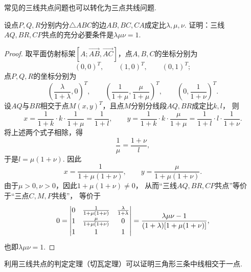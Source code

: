 常见的三线共点问题也可以转化为三点共线问题.

\begin{example}[切瓦定理]
设点\(P,Q,R\)分别内分\(\triangle ABC\)的边\(AB,BC,CA\)成定比\(\lambda,\mu,\nu\).
证明：三线\(AQ,BR,CP\)共点的充分必要条件是\(\lambda \mu \nu = 1\).
\begin{proof}
取平面仿射标架\([A;\vec{AB},\vec{AC}]\)，点\(A,B,C\)的坐标分别为\begin{equation*}
	(0,0)^T, \qquad
	(1,0)^T, \qquad
	(0,1)^T;
\end{equation*}
点\(P,Q,R\)的坐标分别为\begin{equation*}
	\left(\frac{\lambda}{1+\lambda},0\right)^T, \qquad
	\left(\frac{1}{1+\mu},\frac{\mu}{1+\mu}\right)^T, \qquad
	\left(0,\frac{1}{1+\nu}\right)^T.
\end{equation*}
设\(AQ\)与\(BR\)相交于点\(M(x,y)^T\)，且点\(M\)分别分线段\(AQ,BR\)成定比\(k,l\)，
则\begin{equation*}
x = \frac{1}{1+k} \cdot k \cdot \frac{1}{1+\mu}
= \frac{1}{1+l}, \qquad
y = \frac{1}{1+k} \cdot k \cdot \frac{\mu}{1+\mu}
= \frac{1}{1+l} \cdot l \cdot \frac{1}{1+\nu}.
\end{equation*}
将上述两个式子相除，得\begin{equation*}
\frac{1}{\mu}
= \frac{1+\nu}{l},
\end{equation*}于是\(l = \mu(1+\nu)\).
因此\begin{equation*}
	x = \frac{1}{1+\mu(1+\nu)}, \qquad
	y = \frac{\mu}{1+\mu(1+\nu)}.
\end{equation*}
由于\(\mu>0,\nu>0\)，因此\(1+\mu(1+\nu)\neq0\)，
从而“三线\(AQ,BR,CP\)共点”等价于“三点\(C,M,P\)共线”，
等价于\begin{equation*}
	0 = \def\arraystretch{1.2} \begin{vmatrix}
		0 & \frac{1}{1+\mu(1+\nu)} & \frac{\lambda}{1+\lambda} \\
		1 & \frac{\mu}{1+\mu(1+\nu)} & 0 \\
		1 & 1 & 1
	\end{vmatrix}
	= \frac{\lambda \mu \nu - 1}{(1+\lambda) [1+\mu(1+\nu)]},
\end{equation*}
也即\(\lambda \mu \nu = 1\).
\end{proof}
\end{example}

利用三线共点的判定定理（切瓦定理）可以证明三角形三条中线相交于一点.


